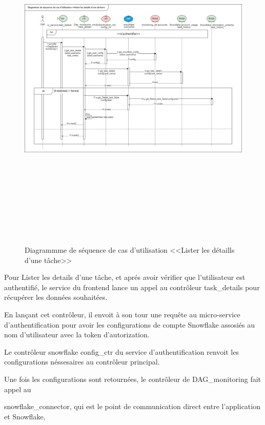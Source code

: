     \begin{figure}[H]
        \centering
        \includegraphics[width =1\linewidth, height=17cm]{img/conception/seq2.png}
        \caption{Diagrammme de séquence de cas d'utilisation <<Lister les détaills d'une tâche>> }
        \label{fig:seq2}
    \end{figure}
    \par Pour Lister les details d'une tâche, et aprés avoir vérifier que l'utilisateur est authentifié, le service du frontend lance un appel au contrôleur task\_details 
    pour récupérer les données souhaitées. 
    \par En lançant cet contrôleur, il envoit à son tour une requête au micro-service d'authentification pour avoir les configurations de compte Snowflake assosiés au nom d'utilisateur avec la token d'autorization.
    \par Le contrôleur snowflake config\_ctr du service d'authentification renvoit les configurations néssesaires au contrôleur principal.
    \par Une fois les configurations sont retournées, le contrôleur de DAG\_monitoring fait appel au \par snowflake\_connector, qui est le point de communication direct entre l'application et Snowflake, 
